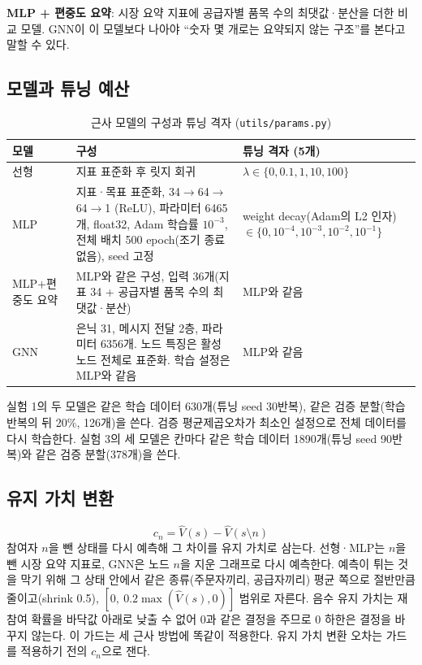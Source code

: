 \documentclass[11pt,a4paper]{article}
\begin{document}
\textbf{MLP + 편중도 요약}: 시장 요약 지표에 공급자별 품목 수의 최댓값·분산을 더한 비교 모델.
GNN이 이 모델보다 나아야 ``숫자 몇 개로는 요약되지 않는 구조''를 본다고 말할 수 있다.

\subsection{모델과 튜닝 예산}\label{sec:models}

\begin{table}[H]
\centering\small
\caption{근사 모델의 구성과 튜닝 격자 (\texttt{utils/params.py})}
\begin{tabularx}{\linewidth}{lYY}
\toprule
모델 & 구성 & 튜닝 격자 (5개)\\
\midrule
선형 & 지표 표준화 후 릿지 회귀 & $\lambda\in\{0,0.1,1,10,100\}$\\
MLP & 지표·목표 표준화, 34$\to$64$\to$64$\to$1 (ReLU), 파라미터 6465개, float32, Adam 학습률 $10^{-3}$, 전체 배치 500 epoch(조기 종료 없음), seed 고정 & weight decay(Adam의 L2 인자) $\in\{0,10^{-4},10^{-3},10^{-2},10^{-1}\}$\\
MLP+편중도 요약 & MLP와 같은 구성, 입력 36개(지표 34 + 공급자별 품목 수의 최댓값·분산) & MLP와 같음\\
GNN & 은닉 31, 메시지 전달 2층, 파라미터 6356개. 노드 특징은 활성 노드 전체로 표준화. 학습 설정은 MLP와 같음 & MLP와 같음\\
\bottomrule
\end{tabularx}
\end{table}

실험 1의 두 모델은 같은 학습 데이터 630개(튜닝 seed 30반복), 같은 검증 분할(학습 반복의 뒤 20\%, 126개)을 쓴다.
검증 평균제곱오차가 최소인 설정으로 전체 데이터를 다시 학습한다.
실험 3의 세 모델은 칸마다 같은 학습 데이터 1890개(튜닝 seed 90반복)와 같은 검증 분할(378개)을 쓴다.

\subsection{유지 가치 변환}

\begin{equation}
  c_n = \hat V(s) - \hat V(s\setminus n)
\end{equation}
참여자 $n$을 뺀 상태를 다시 예측해 그 차이를 유지 가치로 삼는다. 선형·MLP는 $n$을 뺀
시장 요약 지표로, GNN은 노드 $n$을 지운 그래프로 다시 예측한다. 예측이 튀는 것을 막기 위해
그 상태 안에서 같은 종류(주문자끼리, 공급자끼리) 평균 쪽으로 절반만큼 줄이고(shrink 0.5),
$[0,\ 0.2\max(\hat V(s),0)]$ 범위로 자른다. 음수 유지 가치는 재참여 확률을 바닥값 아래로 낮출 수 없어
0과 같은 결정을 주므로 0 하한은 결정을 바꾸지 않는다. 이 가드는 세 근사 방법에 똑같이 적용한다.
유지 가치 변환 오차는 가드를 적용하기 전의 $c_n$으로 잰다.
\end{document}
